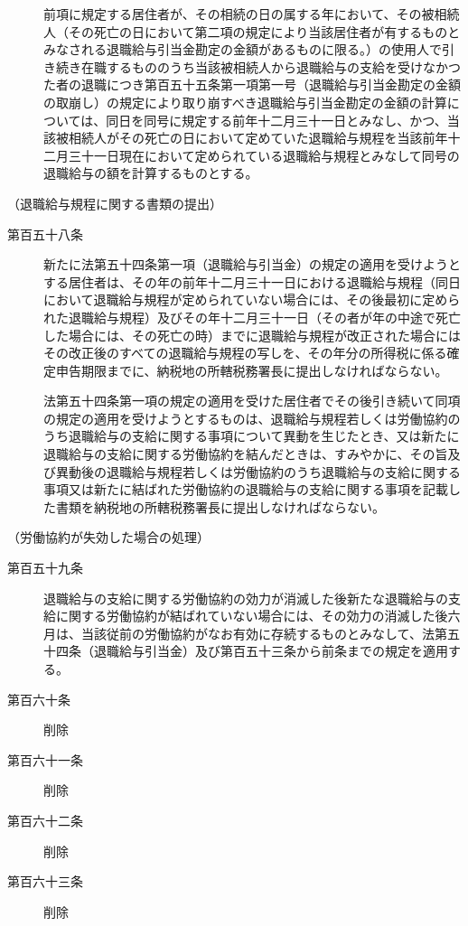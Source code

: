 \documentclass[twocolumn,a4j,10pt]{ltjtarticle}
\begin{document}
\begin{description}
\item[]前項に規定する居住者が、その相続の日の属する年において、その被相続人（その死亡の日において第二項の規定により当該居住者が有するものとみなされる退職給与引当金勘定の金額があるものに限る。）の使用人で引き続き在職するもののうち当該被相続人から退職給与の支給を受けなかつた者の退職につき第百五十五条第一項第一号（退職給与引当金勘定の金額の取崩し）の規定により取り崩すべき退職給与引当金勘定の金額の計算については、同日を同号に規定する前年十二月三十一日とみなし、かつ、当該被相続人がその死亡の日において定めていた退職給与規程を当該前年十二月三十一日現在において定められている退職給与規程とみなして同号の退職給与の額を計算するものとする。
\end{description}
\noindent\hspace{10pt}（退職給与規程に関する書類の提出）
\begin{description}
\item[第百五十八条]新たに法第五十四条第一項（退職給与引当金）の規定の適用を受けようとする居住者は、その年の前年十二月三十一日における退職給与規程（同日において退職給与規程が定められていない場合には、その後最初に定められた退職給与規程）及びその年十二月三十一日（その者が年の中途で死亡した場合には、その死亡の時）までに退職給与規程が改正された場合にはその改正後のすべての退職給与規程の写しを、その年分の所得税に係る確定申告期限までに、納税地の所轄税務署長に提出しなければならない。
\item[]法第五十四条第一項の規定の適用を受けた居住者でその後引き続いて同項の規定の適用を受けようとするものは、退職給与規程若しくは労働協約のうち退職給与の支給に関する事項について異動を生じたとき、又は新たに退職給与の支給に関する労働協約を結んだときは、すみやかに、その旨及び異動後の退職給与規程若しくは労働協約のうち退職給与の支給に関する事項又は新たに結ばれた労働協約の退職給与の支給に関する事項を記載した書類を納税地の所轄税務署長に提出しなければならない。
\end{description}
\noindent\hspace{10pt}（労働協約が失効した場合の処理）
\begin{description}
\item[第百五十九条]退職給与の支給に関する労働協約の効力が消滅した後新たな退職給与の支給に関する労働協約が結ばれていない場合には、その効力の消滅した後六月は、当該従前の労働協約がなお有効に存続するものとみなして、法第五十四条（退職給与引当金）及び第百五十三条から前条までの規定を適用する。
\end{description}
\begin{description}
\item[第百六十条]削除
\end{description}
\begin{description}
\item[第百六十一条]削除
\end{description}
\begin{description}
\item[第百六十二条]削除
\end{description}
\begin{description}
\item[第百六十三条]削除
\end{description}
\end{document}
